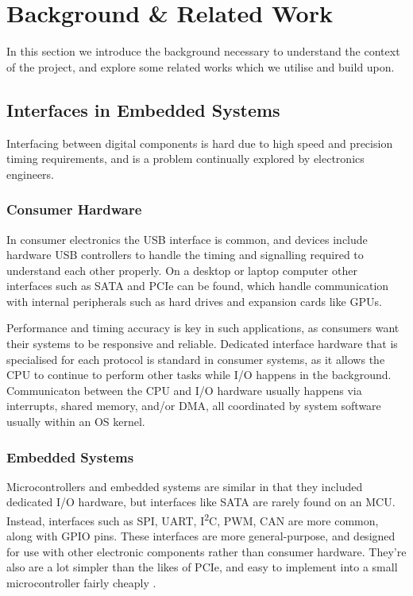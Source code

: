 \chapter{Background \& Related Work}
\label{ch:background}

In this section we introduce the background necessary to understand the context of the project, and explore some related works which we utilise and build upon.

\section{Interfaces in Embedded Systems}
\label{sec:embedded-interfaces}

Interfacing between digital components is hard due to high speed and precision timing requirements, and is a problem continually explored by electronics engineers.

\subsection{Consumer Hardware}
In consumer electronics the USB interface is common, and devices include hardware USB controllers to handle the timing and signalling required to understand each other properly. On a desktop or laptop computer other interfaces such as SATA and PCIe can be found, which handle communication with internal peripherals such as hard drives and expansion cards like GPUs.

Performance and timing accuracy is key in such applications, as consumers want their systems to be responsive and reliable. Dedicated interface hardware that is specialised for each protocol is standard in consumer systems, as it allows the CPU to continue to perform other tasks while I/O happens in the background. Communicaton between the CPU and I/O hardware usually happens via interrupts, shared memory, and/or DMA, all coordinated by system software usually within an OS kernel.

\subsection{Embedded Systems}

Microcontrollers and embedded systems are similar in that they included dedicated I/O hardware, but interfaces like SATA are rarely found on an MCU. Instead, interfaces such as SPI, UART, I\textsuperscript{2}C, PWM, CAN are more common, along with GPIO pins. These interfaces are more general-purpose, and designed for use with other electronic components rather than consumer hardware. They're also are a lot simpler than the likes of PCIe, and easy to implement into a small microcontroller fairly cheaply \cite{rp2040}.

